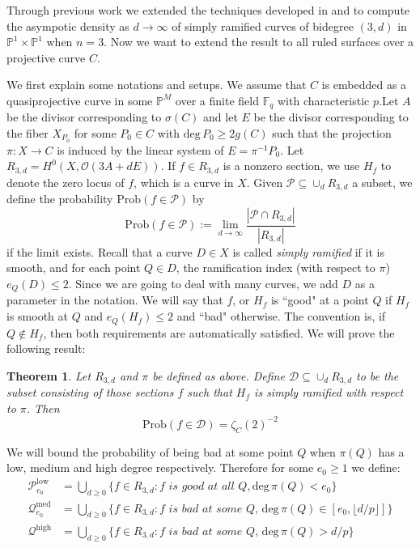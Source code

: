 \documentclass[12pt]{article}
\theoremstyle{plain}
\newtheorem{theorem}[equation]{Theorem}
\theoremstyle{definition}
\newcommand{\IF}{\mathbb{F}}
\newcommand{\IP}{\mathbb{P}}
\newcommand{\sD}{\mathcal{D}}
\newcommand{\sO}{\mathcal{O}}
\newcommand{\sP}{\mathcal{P}}
\newcommand{\sQ}{\mathcal{Q}}
\renewcommand{\deg}{\mathrm{deg}\,}
\newcommand\union{\bigcup}
\newcommand{\<}{\langle}
\renewcommand{\>}{\rangle}
\newcommand{\Prob}{\mathrm{Prob}}
\begin{document}
Through previous work we extended the techniques developed in \cite{Poonen} and \cite{Wood} to compute the asympotic density as $d \to \infty$ of simply ramified curves of bidegree $(3, d)$ in $\IP^1 \times \IP^1$ when $n = 3$. Now we want to extend the result to all ruled surfaces over a projective curve $C$. 

We first explain some notations and setups. We assume that $C$ is embedded as a quasiprojective curve in some $\IP^M$ over a finite field $\IF_q$ with characteristic $p$.Let $A$ be the divisor corresponding to $\sigma(C)$ and let $E$ be the divisor corresponding to the fiber $X_{P_0}$ for some $P_0 \in C$ with $\deg P_0 \ge 2g(C)$ such that the projection $\pi : X \to C$ is induced by the linear system of $E = \pi^{-1}P_0$. Let $R_{3, d} = H^0(X, \sO(3A + dE))$. If $f \in R_{3, d}$ is a nonzero section, we use $H_f$ to denote the zero locus of $f$, which is a curve in $X$. Given $\sP \subseteq \cup_d R_{3, d}$ a subset, we define the probability $\Prob(f \in \sP)$ by 
$$ \Prob(f \in \sP) := \lim_{d \to \infty} \frac{|\sP \cap R_{3, d}|}{|R_{3, d}|} $$
if the limit exists. 
Recall that a curve $D \in X$ is called \textit{simply ramified} if it is smooth, and for each point $Q \in D$, the ramification index (with respect to $\pi$) $e_Q(D) \le 2$. Since we are going to deal with many curves, we add $D$ as a parameter in the notation. We will say that $f$, or $H_f$ is ``good" at a point $Q$ if $H_f$ is smooth at $Q$ and $e_Q(H_f) \le 2$ and ``bad" otherwise. The convention is, if $Q \not\in H_f$, then both requirements are automatically satisfied. 
We will prove the following result: 

\begin{theorem}
Let $R_{3, d}$ and $\pi$ be defined as above. Define $\sD \subseteq \cup_d R_{3, d}$ to be the subset consisting of those sections $f$ such that $H_f$ is simply ramified with respect to $\pi$. Then 
$$ \Prob( f \in \sD) = \zeta_C(2)^{-2} $$
\end{theorem}
We will bound the probability of being bad at some point $Q$ when $\pi(Q)$ has a low, medium and high degree respectively. Therefore for some $e_0 \ge 1$ we define: 
\begin{align*}
\sP_{e_0}^{\mathrm{low}} &= \union_{d \ge 0} \{ f \in R_{3, d} : f \textit{ is good at all $Q$}, \deg \pi(Q) < e_0\}\\
\sQ_{e_0}^{\mathrm{med}} &= \union_{d \ge 0} \{f \in R_{3, d} : f \textit{ is bad at some $Q$, }\deg \pi(Q) \in [e_0, \lfloor d/p \rfloor]\}\\
\sQ^{\mathrm{high}} &= \union_{d \ge 0} \{f \in R_{3, d} : f \textit{ is bad at some $Q$, }\deg \pi(Q) > d/p\}
\end{align*}
\end{document}
